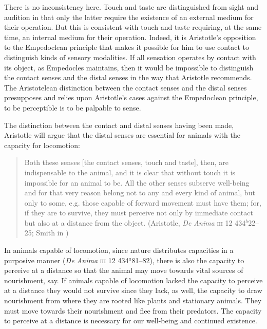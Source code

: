 There is no inconsistency here. Touch and taste are distinguished from sight and audition in that only the latter require the existence of an external medium for their operation. But this is consistent with touch and taste requiring, at the same time, an internal medium for their operation. Indeed, it is Aristotle's opposition to the Empedoclean principle that makes it possible for him to use contact to distinguish kinds of sensory modalities. If all sensation operates by contact with its object, as Empedocles maintains, then it would be impossible to distinguish the contact senses and the distal senses in the way that Aristotle recommends. The Aristotelean distinction between the contact senses and the distal senses presupposes and relies upon Aristotle's cases against the Empedoclean principle, to be perceptible is to be palpable to sense.

The distinction between the contact and distal senses having been made, Aristotle will argue that the distal senses are essential for animals with the capacity for locomotion:
\begin{quote}
	Both these senses [the contact senses, touch and taste], then, are indispensable to the animal, and it is clear that without touch it is impossible for an animal to be. All the other senses subserve well-being and for that very reason belong not to any and every kind of animal, but only to some, e.g. those capable of forward movement must have them; for, if they are to survive, they must perceive not only by immediate contact but also at a distance from the object. (Aristotle, \emph{De Anima} \textsc{iii} 12 434\( ^{b} \)22--25; Smith in \citealt[62]{Barnes:1984uq})
\end{quote}
In animals capable of locomotion, since nature distributes capacities in a purposive manner (\emph{De Anima} \textsc{iii} 12 434\( ^{a} \)81--82), there is also the capacity to perceive at a distance so that the animal may move towards vital sources of nourishment, say. If animals capable of locomotion lacked the capacity to perceive at a distance they would not survive since they lack, as well, the capacity to draw nourishment from where they are rooted like plants and stationary animals. They must move towards their nourishment and flee from their predators. The capacity to perceive at a distance is necessary for our well-being and continued existence.

